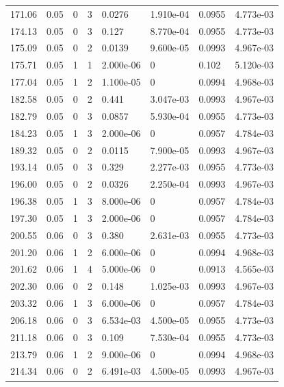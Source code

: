 \documentclass[preview]{standalone}
\begin{document}
{{{\begin{tabular}{L{1.2cm}C{1.2cm} C{0.3cm}C{0.5cm} C{1.4cm}C{1.4cm} C{1.4cm}C{1.4cm}}
  171.06  &  0.05  & 0     &  3 &  0.0276  & 1.910e-04  & 0.0955 &  4.773e-03   \\ 
  174.13  &  0.05  & 0     &  3 &  0.127  & 8.770e-04  & 0.0955 &  4.773e-03   \\ 
  175.09  &  0.05  & 0     &  2 &  0.0139  & 9.600e-05  & 0.0993 &  4.967e-03   \\ 
  175.71  &  0.05  & 1     &  1 &  2.000e-06  & 0  & 0.102 &  5.120e-03   \\ 
  177.04  &  0.05  & 1     &  2 &  1.100e-05  & 0  & 0.0994 &  4.968e-03   \\ 
  182.58  &  0.05  & 0     &  2 &  0.441  & 3.047e-03  & 0.0993 &  4.967e-03   \\ 
  182.79  &  0.05  & 0     &  3 &  0.0857  & 5.930e-04  & 0.0955 &  4.773e-03   \\ 
  184.23  &  0.05  & 1     &  3 &  2.000e-06  & 0  & 0.0957 &  4.784e-03   \\ 
  189.32  &  0.05  & 0     &  2 &  0.0115  & 7.900e-05  & 0.0993 &  4.967e-03   \\ 
  193.14  &  0.05  & 0     &  3 &  0.329  & 2.277e-03  & 0.0955 &  4.773e-03   \\ 
  196.00  &  0.05  & 0     &  2 &  0.0326  & 2.250e-04  & 0.0993 &  4.967e-03   \\ 
  196.38  &  0.05  & 1     &  3 &  8.000e-06  & 0  & 0.0957 &  4.784e-03   \\ 
  197.30  &  0.05  & 1     &  3 &  2.000e-06  & 0  & 0.0957 &  4.784e-03   \\ 
  200.55  &  0.06  & 0     &  3 &  0.380  & 2.631e-03  & 0.0955 &  4.773e-03   \\ 
  201.20  &  0.06  & 1     &  2 &  6.000e-06  & 0  & 0.0994 &  4.968e-03   \\ 
  201.62  &  0.06  & 1     &  4 &  5.000e-06  & 0  & 0.0913 &  4.565e-03   \\ 
  202.30  &  0.06  & 0     &  2 &  0.148  & 1.025e-03  & 0.0993 &  4.967e-03   \\ 
  203.32  &  0.06  & 1     &  3 &  6.000e-06  & 0  & 0.0957 &  4.784e-03   \\ 
  206.18  &  0.06  & 0     &  3 &  6.534e-03  & 4.500e-05  & 0.0955 &  4.773e-03   \\ 
  211.18  &  0.06  & 0     &  3 &  0.109  & 7.530e-04  & 0.0955 &  4.773e-03   \\ 
  213.79  &  0.06  & 1     &  2 &  9.000e-06  & 0  & 0.0994 &  4.968e-03   \\ 
  214.34  &  0.06  & 0     &  2 &  6.491e-03  & 4.500e-05  & 0.0993 &  4.967e-03   \\ 

\end{tabular}}}}
\end{document}

